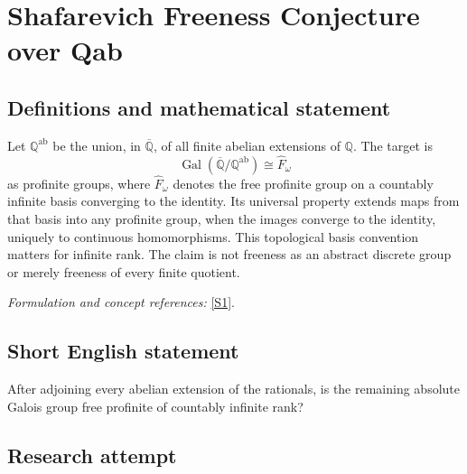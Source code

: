 \documentclass[11pt,a4paper]{article}
\newcommand{\Q}{\mathbb{Q}}
\newcommand{\sref}[2]{\hyperlink{source:#1:#2}{[S#2]}}
\newif\ifshowcatalogue
\newcommand{\cataloguescope}[1]{\ifshowcatalogue
 \paragraph{Exact scope in the supplied catalogue.}
 \begin{quote}\small #1\end{quote}\fi}
\numberwithin{equation}{section}
\begin{document}
\setcounter{section}{229}
\clearpage
\section{\texorpdfstring{Shafarevich Freeness Conjecture over Qab}{Shafarevich Freeness Conjecture over Qab}}\label{230}
\subsection{Definitions and mathematical statement}
Let $\Q^{\mathrm{ab}}$ be the union, in $\overline{\Q}$, of all finite abelian extensions of $\Q$. The target is
\[
 \operatorname{Gal}(\overline{\Q}/\Q^{\mathrm{ab}})\cong\widehat F_\omega
\]
as profinite groups, where $\widehat F_\omega$ denotes the free profinite group on a countably infinite basis converging to the identity. Its universal property extends maps from that basis into any profinite group, when the images converge to the identity, uniquely to continuous homomorphisms. This topological basis convention matters for infinite rank. The claim is not freeness as an abstract discrete group or merely freeness of every finite quotient.
\par\smallskip\textit{Formulation and concept references:} \sref{230}{1}.
\cataloguescope{Let Qab be the maximal abelian extension of Q in an algebraic closure Qbar (equivalently the maximal cyclotomic extension). The absolute Galois group Gal(Qbar/Qab) is a free profinite group of countably infinite rank, in the standard profinite convention of a free basis converging to the identity.}
\subsection{Short English statement}
After adjoining every abelian extension of the rationals, is the remaining absolute Galois group free profinite of countably infinite rank?
\subsection{Research attempt}
\end{document}
